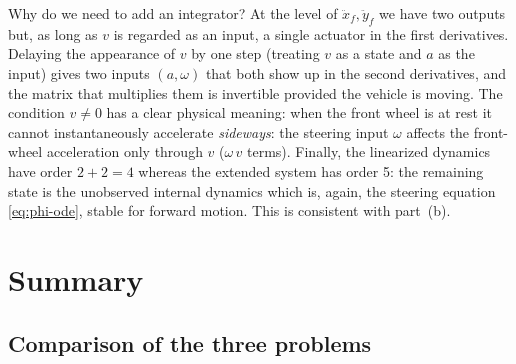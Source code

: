 \documentclass[11pt,a4paper]{article}
\theoremstyle{definition}
\theoremstyle{plain}
\theoremstyle{remark}
\begin{document}
\begin{intuition}
Why do we need to add an integrator? At the level of $\ddot x_f,\ddot y_f$ we have two outputs but, as long as $v$ is regarded as an input, a single actuator in the first derivatives. Delaying the appearance of $v$ by one step (treating $v$ as a state and $a$ as the input) gives two inputs $(a,\omega)$ that both show up in the second derivatives, and the matrix that multiplies them is invertible provided the vehicle is moving. The condition $v\neq0$ has a clear physical meaning: when the front wheel is at rest it cannot instantaneously accelerate \emph{sideways}: the steering input $\omega$ affects the front-wheel acceleration only through $v$ ($\omega\,v$ terms). Finally, the linearized dynamics have order $2+2=4$ whereas the extended system has order 5: the remaining state is the unobserved internal dynamics which is, again, the steering equation \eqref{eq:phi-ode}, stable for forward motion. This is consistent with part~(b).
\end{intuition}

\section{Summary}
\label{sec:summary}

\subsection{Comparison of the three problems}
\end{document}
